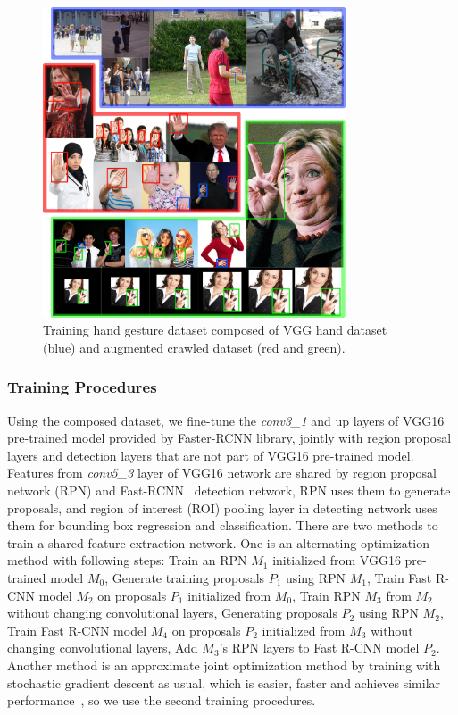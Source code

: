 \begin{figure}[!htbp]
    \centering
    \includegraphics[width=0.8\textwidth]{figure/ch4-gesturedataset.png}
    \caption{Training hand gesture dataset composed of VGG hand dataset (blue) and augmented crawled dataset (red and green).}
    \label{fig:ch4-gesturedataset}
\end{figure}

\subsubsection{Training Procedures}
Using the composed dataset, we fine-tune the \emph{conv3\_1} and up layers of VGG16 pre-trained model provided by Faster-RCNN library, jointly with region proposal layers and detection layers that are not part of VGG16 pre-trained model. Features from \emph{conv5\_3} layer of VGG16 network are shared by region proposal network (RPN) and Fast-RCNN~\cite{girshick2015fast} detection network, RPN uses them to generate proposals, and region of interest (ROI) pooling layer in detecting network uses them for bounding box regression and classification. There are two methods to train a shared feature extraction network. One is an alternating optimization method with following steps:  Train an RPN $M_1$ initialized from VGG16 pre-trained model $M_0$,  Generate training proposals $P_1$ using RPN $M_1$,  Train Fast R-CNN model $M_2$ on proposals $P_1$ initialized from $M_0$,  Train RPN $M_3$ from $M_2$ without changing convolutional layers,  Generating proposals $P_2$ using RPN $M_2$,  Train Fast R-CNN model $M_4$ on proposals $P_2$ initialized from $M_3$ without changing convolutional layers,  Add $M_3$'s RPN layers to Fast R-CNN model $P_2$. Another method is an approximate joint optimization method by training with stochastic gradient descent as usual, which is easier, faster and achieves similar performance~\cite{links:pyfasterrcnn}, so we use the second training procedures.

